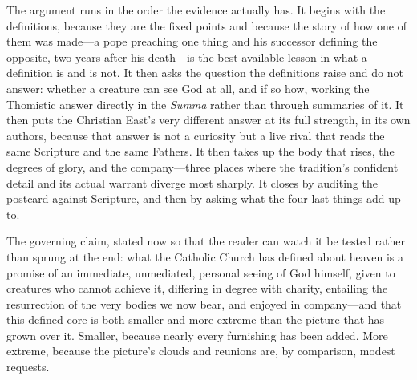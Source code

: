 The argument runs in the order the evidence actually has. It begins with the definitions, because they are the fixed points and because the story of how one of them was made---a pope preaching one thing and his successor defining the opposite, two years after his death---is the best available lesson in what a definition is and is not. It then asks the question the definitions raise and do not answer: whether a creature can see God at all, and if so how, working the Thomistic answer directly in the \emph{Summa} rather than through summaries of it. It then puts the Christian East's very different answer at its full strength, in its own authors, because that answer is not a curiosity but a live rival that reads the same Scripture and the same Fathers. It then takes up the body that rises, the degrees of glory, and the company---three places where the tradition's confident detail and its actual warrant diverge most sharply. It closes by auditing the postcard against Scripture, and then by asking what the four last things add up to.

The governing claim, stated now so that the reader can watch it be tested rather than sprung at the end: what the Catholic Church has defined about heaven is a promise of an immediate, unmediated, personal seeing of God himself, given to creatures who cannot achieve it, differing in degree with charity, entailing the resurrection of the very bodies we now bear, and enjoyed in company---and that this defined core is both smaller and more extreme than the picture that has grown over it. Smaller, because nearly every furnishing has been added. More extreme, because the picture's clouds and reunions are, by comparison, modest requests.
